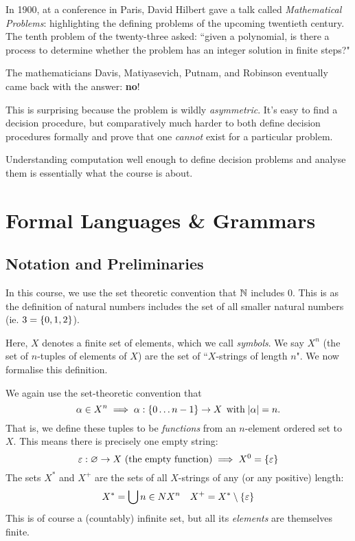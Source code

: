 \documentclass{article}
\begin{document}
\begin{remark}
	In 1900, at a conference in Paris, David Hilbert gave a talk called \textit{Mathematical Problems}: highlighting the defining problems of the upcoming twentieth century. The tenth problem of the twenty-three asked: ``given a polynomial, is there a process to determine whether the problem has an integer solution in finite steps?"
	
	The mathematicians Davis, Matiyasevich, Putnam, and Robinson eventually came back with the answer: \textbf{no}!
		
	This is surprising because the problem is wildly \textit{asymmetric}. It's easy to find a decision procedure, but comparatively much harder to both define decision procedures formally and prove that one \textit{cannot} exist for a particular problem.
\end{remark}

Understanding computation well enough to define decision problems and analyse them is essentially what the course is about.

\pagebreak
\section{Formal Languages \& Grammars}
\subsection{Notation and Preliminaries}

\begin{note}
	In this course, we use the set theoretic convention that $\mathbb{N}$ includes 0. This is as the definition of natural numbers includes the set of all smaller natural numbers (ie. $3 = \left\lbrace 0, 1, 2 \right\rbrace$).
\end{note}

Here, $X$ denotes a finite set of elements, which we call \textit{symbols}. We say $X^n$ (the set of $n$-tuples of elements of $X$) are the set of ``$X$-strings of length $n$". We now formalise this definition.

\begin{definition}[$X$-strings]
	\label{x-strings}
	We again use the set-theoretic convention that
	\[
		\alpha \in X^n \implies \alpha : \left\lbrace 0 \ldots n-1 \right\rbrace \to X \mathrel{\, \text{with}} \left\lvert \alpha \right\rvert = n.
	\]
	That is, we define these tuples to be \textit{functions} from an $n$-element ordered set to $X$. This means there is precisely one empty string:
	\[
		\varepsilon : \varnothing \to X \text{ (the empty function)} \implies X^0 = \left\lbrace \varepsilon \right\rbrace
	\]
	The sets $X^*$ and $X^+$ are the sets of all $X$-strings of any (or any positive) length:
	\[
		X^* = \bigcup{n \in N} X^n \quad X^+ = X^* \setminus \left\lbrace \varepsilon \right\rbrace
	\]
	This is of course a (countably) infinite set, but all its \textit{elements} are themselves finite. 
\end{definition}
\end{document}
